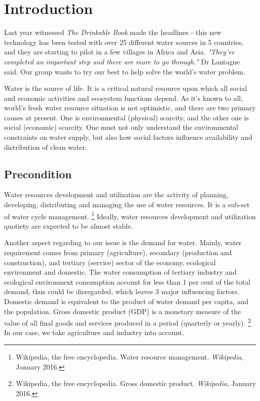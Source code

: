 \documentclass[tcn = 45538, sheet = true, abstract = true]{mcmthesis}
\begin{document}
\tableofcontents
\newpage

\section{Introduction}

\hspace{1.5 em} Last year witnessed \emph{The Drinkable Book} made the headlines - 
this new technology has been tested with over 25 different water sources in 5 countries, 
and they are starting to pilot in a few villages in Africa and Asia. 
\emph{"They've completed an important step and there are more to go through."} 
Dr Lantagne said. 
Our group wants to try our best to help solve the world's water problem.

Water is the source of life. 
It is a critical natural resource upon which all social and economic activities and ecosystem functions depend. 
As it's known to all, world's fresh water resource situation is not optimistic, 
and there are two primary causes at present. 
One is environmental (physical) scarcity, 
and the other one is social (economic) scarcity. 
One must not only understand the environmental constraints on water supply, 
but also how social factors influence availability and distribution of clean water. 

\subsection{Precondition}
\label{precondition}

\hspace{1.5 em} Water resources development and utilization are the activity of planning, 
developing, distributing and managing the use of water resources. 
It is a sub-set of water cycle management.
\footnote{Wikipedia, the free encyclopedia. 
Water resource management. 
\emph{Wikipedia}, 
January 2016.}
Ideally, water resources development and utilization quotiety are expected to be almost stable.

Another aspect regarding to our issue is the demand for water. 
Mainly, water requirement comes from primary (agriculture), 
secondary (production and construction), 
and tertiary (service)
sector of the economy, 
ecological environment and domestic. 
The water consumption of tertiary industry and ecological environment consumption account for less than 1 per cent of the total demand, 
thus could be disregarded, 
which leaves 3 major influencing factors. 
Domestic demand is equivalent to the product of water demand per capita, 
and the population. 
Gross domestic product (GDP) 
is a monetary measure of the value of all final goods and services produced in a period 
(quarterly or yearly).
\footnote{Wikipedia, the free encyclopedia. 
Gross domestic product. 
\emph{Wikipedia}, 
January 2016.}
In our case, 
we take agriculture and industry into account. 
\end{document}
